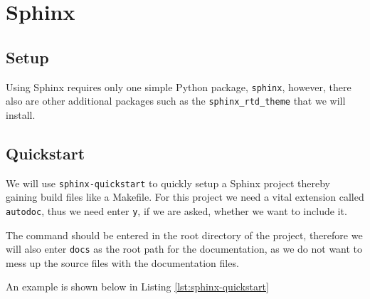 \documentclass[../main/main.tex]{subfiles}
\begin{document}
\section{Sphinx}

\subsection{Setup}

Using Sphinx requires only one simple Python package, \lstinline|sphinx|,
however, there also are other additional packages such as the
\lstinline|sphinx_rtd_theme| that we will install. 

\subsection{Quickstart}

We will use \lstinline|sphinx-quickstart| to quickly setup a Sphinx project
thereby gaining build files like a Makefile. For this project we need a vital
extension called \lstinline|autodoc|, thus we need enter \lstinline|y|, if we
are asked, whether we want to include it. 

The command should be entered in the root directory of the project, therefore
we will also enter \lstinline|docs| as the root path for the documentation, as
we do not want to mess up the source files with the documentation files. 

An example is shown below in Listing \ref{lst:sphinx-quickstart}
\end{document}
